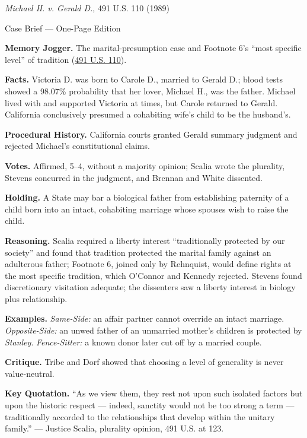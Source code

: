 \documentclass[12pt]{article}
\begin{document}
\begin{center}
{\Large \textit{Michael H. v. Gerald D.}, 491 U.S. 110 (1989)\par}
\vspace{0.3em}
{\normalsize Case Brief --- One-Page Edition\par}
\end{center}

\textbf{Memory Jogger.} The marital-presumption case and Footnote 6's ``most specific level'' of tradition (\href{https://supreme.justia.com/cases/federal/us/491/110/}{491 U.S. 110}).

\textbf{Facts.} Victoria D. was born to Carole D., married to Gerald D.; blood tests showed a 98.07\% probability that her lover, Michael H., was the father. Michael lived with and supported Victoria at times, but Carole returned to Gerald. California conclusively presumed a cohabiting wife's child to be the husband's.

\textbf{Procedural History.} California courts granted Gerald summary judgment and rejected Michael's constitutional claims.

\textbf{Votes.} Affirmed, 5--4, without a majority opinion; Scalia wrote the plurality, Stevens concurred in the judgment, and Brennan and White dissented.

\textbf{Holding.} A State may bar a biological father from establishing paternity of a child born into an intact, cohabiting marriage whose spouses wish to raise the child.

\textbf{Reasoning.} Scalia required a liberty interest ``traditionally protected by our society'' and found that tradition protected the marital family against an adulterous father; Footnote 6, joined only by Rehnquist, would define rights at the most specific tradition, which O'Connor and Kennedy rejected. Stevens found discretionary visitation adequate; the dissenters saw a liberty interest in biology plus relationship.

\textbf{Examples.} \emph{Same-Side:} an affair partner cannot override an intact marriage. \emph{Opposite-Side:} an unwed father of an unmarried mother's children is protected by \textit{Stanley}. \emph{Fence-Sitter:} a known donor later cut off by a married couple.

\textbf{Critique.} Tribe and Dorf showed that choosing a level of generality is never value-neutral.

\textbf{Key Quotation.} ``As we view them, they rest not upon such isolated factors but upon the historic respect --- indeed, sanctity would not be too strong a term --- traditionally accorded to the relationships that develop within the unitary family.'' --- Justice Scalia, plurality opinion, 491 U.S. at 123.
\end{document}
